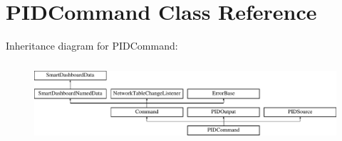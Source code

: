 \hypertarget{classPIDCommand}{
\section{PIDCommand Class Reference}
\label{classPIDCommand}
}
Inheritance diagram for PIDCommand:\begin{figure}[H]
\begin{center}
\leavevmode
\includegraphics[height=3.010753cm]{classPIDCommand}
\end{center}
\end{figure}
